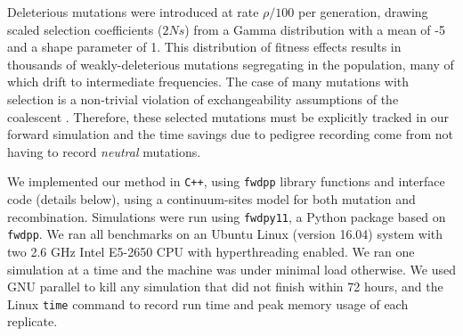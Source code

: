 \documentclass{article}
\newcommand{\fwdpp}{\texttt{fwdpp}}
\newcommand{\fwdpy}{\texttt{fwdpy11}}
\newcommand{\cpp}{\texttt{C++}}
\newcommand{\krt}[1]{{\em \color{green} #1}}
\begin{document}
Deleterious mutations were introduced at rate $\rho/100$ per generation, drawing scaled selection
coefficients ($2Ns$)
from a Gamma distribution with a mean of -5 and a shape parameter of 1.  This distribution of fitness effects results in
thousands of weakly-deleterious mutations segregating in the population, many of which drift to intermediate
frequencies.  The case of many mutations with selection is a non-trivial violation of exchangeability assumptions of the
coalescent \citep{Neuhauser1997-nn}.  Therefore, these selected mutations must be explicitly tracked in our forward simulation
and the time savings due to pedigree recording come from not having to record \textit{neutral} mutations.

We implemented our method in \cpp{}, using \fwdpp{} library functions and
interface code (details below), using a continuum-sites model for both mutation
and recombination. Simulations were run using \fwdpy{}, a Python package based
on \fwdpp.
We ran all benchmarks on an Ubuntu Linux (version 16.04) system with two 2.6 GHz Intel E5-2650 CPU with
hyperthreading enabled.
We ran one simulation at a time and the machine was under minimal load otherwise.
We used GNU parallel \citep{Tange2011a} to kill any simulation that did not finish within 72 hours,
and the Linux \texttt{time} command to record run time and peak memory usage of each replicate.

\end{document}
